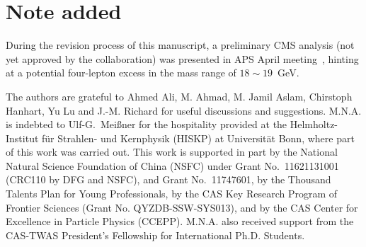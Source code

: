 \documentclass[twocolumn,showpacs,superscriptaddress,preprintnumbers,nofootinbib,prd]{revtex4-1}
\begin{document}
\section*{Note added}

During the revision process of this manuscript, a preliminary CMS analysis
(not yet approved by the collaboration) was presented in APS April
meeting~\cite{Durgut},
hinting at a potential four-lepton excess in the mass range
of $18\sim19$~GeV.


\begin{acknowledgments}

The authors are grateful to Ahmed Ali, M. Ahmad, M. Jamil Aslam, Chirstoph Hanhart, Yu Lu and J.-M. Richard
for useful discussions and suggestions. M.N.A. is indebted to Ulf-G.~Mei{\ss}ner for the hospitality
provided at the Helmholtz-Institut f\"ur Strahlen- und Kernphysik (HISKP) at
Universit\"at Bonn, where part of this work was carried out.
This work is supported in part by the National Natural Science Foundation of
China (NSFC) under Grant No.~11621131001 (CRC110 by DFG and NSFC), and Grant
No.~11747601, by the Thousand Talents Plan for Young Professionals, by the
CAS Key Research Program of Frontier Sciences (Grant No. QYZDB-SSW-SYS013), and by the CAS Center for Excellence in Particle Physics (CCEPP).
M.N.A. also received support from the CAS-TWAS President's Fellowship for International
Ph.D. Students.

\end{acknowledgments}
\end{document}
